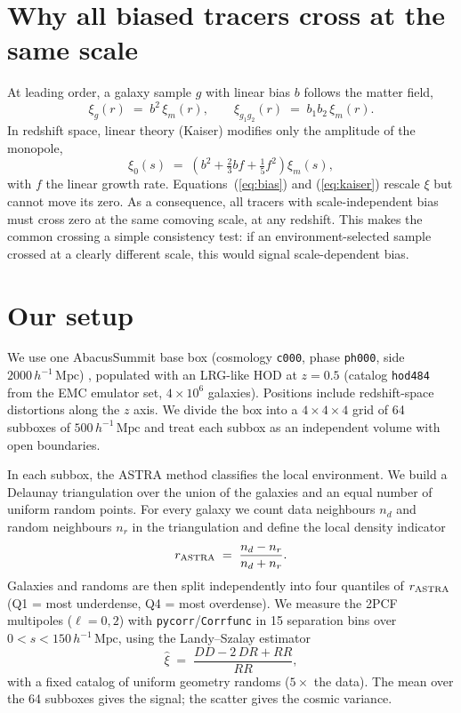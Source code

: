 \documentclass[11pt]{article}
\newcommand{\Mpch}{\,h^{-1}\,\mathrm{Mpc}}
\begin{document}
\section{Why all biased tracers cross at the same scale}

At leading order, a galaxy sample $g$ with linear bias $b$ follows the
matter field,
\begin{equation}
\xi_{g}(r) \;=\; b^{2}\, \xi_{m}(r),
\qquad
\xi_{g_1 g_2}(r) \;=\; b_{1} b_{2}\, \xi_{m}(r).
\label{eq:bias}
\end{equation}
In redshift space, linear theory (Kaiser) modifies only the amplitude of
the monopole,
\begin{equation}
\xi_{0}(s) \;=\;
\left( b^{2} + \tfrac{2}{3} b f + \tfrac{1}{5} f^{2} \right)
\xi_{m}(s),
\label{eq:kaiser}
\end{equation}
with $f$ the linear growth rate.  Equations~(\ref{eq:bias}) and
(\ref{eq:kaiser}) rescale $\xi$ but cannot move its zero.  As a
consequence, all tracers with scale-independent bias must cross zero at
the same comoving scale, at any redshift.  This makes the common crossing
a simple consistency test: if an environment-selected sample crossed at a
clearly different scale, this would signal scale-dependent bias.

\section{Our setup}

We use one AbacusSummit base box (cosmology \texttt{c000}, phase
\texttt{ph000}, side $2000\Mpch$) \cite{maksimova2021}, populated with an
LRG-like HOD at $z=0.5$ (catalog \texttt{hod484} from the EMC emulator
set, $4\times10^{6}$ galaxies).  Positions include redshift-space
distortions along the $z$ axis.  We divide the box into a $4\times4\times4$
grid of 64 subboxes of $500\Mpch$ and treat each subbox as an independent
volume with open boundaries.

In each subbox, the ASTRA method classifies the local environment.  We
build a Delaunay triangulation over the union of the galaxies and an equal
number of uniform random points.  For every galaxy we count data
neighbours $n_{d}$ and random neighbours $n_{r}$ in the triangulation and
define the local density indicator
\begin{equation}
r_{\rm ASTRA} \;=\; \frac{n_{d} - n_{r}}{n_{d} + n_{r}} .
\label{eq:astra}
\end{equation}
Galaxies and randoms are then split independently into four quantiles of
$r_{\rm ASTRA}$ (Q1 = most underdense, Q4 = most overdense).  We measure
the 2PCF multipoles ($\ell = 0, 2$) with \texttt{pycorr}/\texttt{Corrfunc}
\cite{sinha2020} in 15 separation bins over $0 < s < 150\Mpch$, using the
Landy--Szalay estimator \cite{landy1993}
\begin{equation}
\hat{\xi} \;=\; \frac{DD - 2\,DR + RR}{RR},
\label{eq:ls}
\end{equation}
with a fixed catalog of uniform geometry randoms ($5\times$ the data).
The mean over the 64 subboxes gives the signal; the scatter gives the
cosmic variance.
\end{document}
